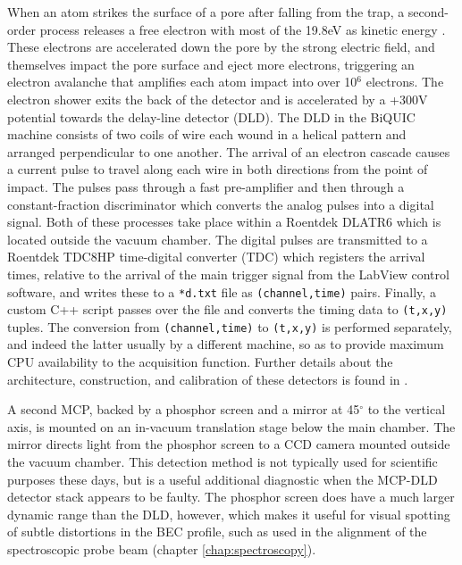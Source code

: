 	When an atom strikes the surface of a pore after falling from the trap, a second-order process releases a free electron with most of the 19.8eV as kinetic energy \cite{Jagutzi02,Hotop96}.
	These electrons are accelerated down the pore by the strong electric field, and themselves impact the pore surface and eject more electrons, triggering an electron avalanche that amplifies each atom impact into over 10$^6$ electrons.
	The electron shower exits the back of the detector and is accelerated by a +300V potential towards the delay-line detector (DLD).
	The DLD in the BiQUIC machine consists of two coils of wire each wound in a helical pattern and arranged perpendicular to one another.
	 The arrival of an electron cascade causes a current pulse to travel along each wire in both directions from the point of impact.
	The pulses pass through a fast pre-amplifier and then through a constant-fraction discriminator which converts the analog pulses into a digital signal.
	Both of these processes take place within a Roentdek DLATR6 which is located outside the vacuum chamber.
	The digital pulses are transmitted to a Roentdek TDC8HP time-digital converter (TDC) which registers the arrival times, relative to the arrival of the main trigger signal from the LabView control software, and writes these to a \verb|*d.txt| file as \verb|(channel,time)| pairs.
	Finally, a custom C++ script passes over the file and converts the timing data to \verb|(t,x,y)| tuples.
	The conversion from \verb|(channel,time)| to \verb|(t,x,y)| is performed separately, and indeed the latter usually by a different machine, so as to provide maximum CPU availability to the acquisition function.	Further details about the architecture, construction, and calibration of these detectors is found in \cite{HodgmanThesis,ManningThesis}.

	A second MCP, backed by a phosphor screen and a mirror at 45$^\circ$ to the vertical axis, is mounted on an in-vacuum translation stage below the main chamber.
	The mirror directs light from the phosphor screen to a CCD camera mounted outside the vacuum chamber.
	This detection method is not typically used for scientific purposes these days, but is a useful additional diagnostic when the MCP-DLD detector stack appears to be faulty.
	The phosphor screen does have a much larger dynamic range than the DLD, however, which makes it useful for visual spotting of subtle distortions in the BEC profile, such as used in the alignment of the spectroscopic probe beam (chapter \ref{chap:spectroscopy}).
	


